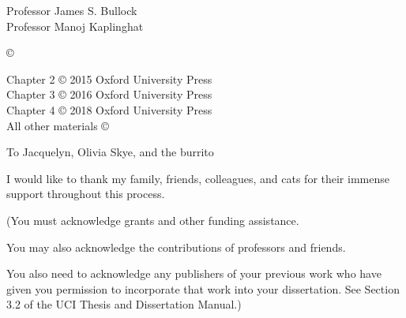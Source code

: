 




\othercommitteemembers
{
  Professor James S. Bullock\\
  Professor Manoj Kaplinghat
}


\copyrightdeclaration
{
  {\copyright} {\Degreeyear} \Authorname
}

 \prepublishedcopyrightdeclaration
 {
 	Chapter 2 {\copyright} 2015 Oxford University Press \\
    Chapter 3 {\copyright} 2016 Oxford University Press \\
    Chapter 4 {\copyright} 2018 Oxford University Press \\
 	All other materials {\copyright} {\Degreeyear} \Authorname
 }

\dedications
{ 
  To Jacquelyn, Olivia Skye, and the burrito
}

\acknowledgments
{
  I would like to thank my family, friends, colleagues, and cats for
  their immense support throughout this process.
  
  (You must acknowledge grants and other funding assistance. 
  
  You may also acknowledge the contributions of professors and
  friends.
  
  You also need to acknowledge any publishers of your previous
  work who have given you permission to incorporate that work
  into your dissertation. See Section 3.2 of the UCI Thesis and
  Dissertation Manual.)
}


